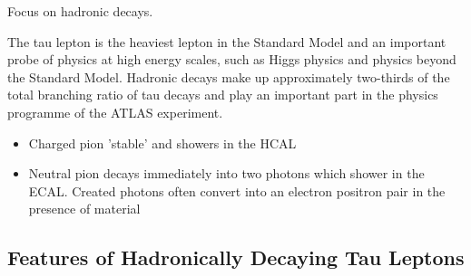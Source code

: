 Focus on hadronic decays.



The tau lepton is the heaviest lepton in the Standard Model and an important
probe of physics at high energy scales, such as Higgs physics and physics beyond
the Standard Model. Hadronic decays make up approximately two-thirds of the
total branching ratio of tau decays and play an important part in the physics
programme of the ATLAS experiment.


\begin{itemize}
\item Charged pion 'stable' and showers in the HCAL
\item Neutral pion decays immediately into two photons which shower in the ECAL.
  Created photons often convert into an electron positron pair in the presence
  of material
\end{itemize}


\subsection{Features of Hadronically Decaying Tau Leptons}
\label{sec:features_tau_decay}






